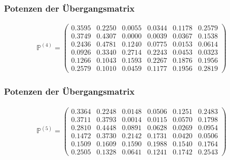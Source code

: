 \documentclass[compress]{beamer}
\begin{document}
	\begin{frame}
		\frametitle{Potenzen der Übergangsmatrix}
		\begin{center}
			\begin{align*}
				\mathbb{P} ^{(4)} =
				\begin{pmatrix} 
				  0.3595 &  0.2250 &  0.0055 &  0.0344 &  0.1178 &  0.2579\\
				  0.3749 &  0.4307 &  0.0000 &  0.0039 &  0.0367 &  0.1538\\
				  0.2436 &  0.4781 &  0.1240 &  0.0775 &  0.0153 &  0.0614\\
				  0.0926 &  0.3340 &  0.2714 &  0.2243 &  0.0453 &  0.0323\\
				  0.1266 &  0.1043 &  0.1593 &  0.2267 &  0.1876 &  0.1956\\
				  0.2579 &  0.1010 &  0.0459 &  0.1177 &  0.1956 &  0.2819
				\end{pmatrix} 
			\end{align*}
		\end{center}
	\end{frame}


	\begin{frame}
		\frametitle{Potenzen der Übergangsmatrix}
		\begin{center}
			\begin{align*}
				\mathbb{P} ^{(5)} =
				\begin{pmatrix} 
				  0.3364 &  0.2248 &  0.0148 &  0.0506 &  0.1251 &  0.2483\\
				  0.3711 &  0.3793 &  0.0014 &  0.0115 &  0.0570 &  0.1798\\
				  0.2810 &  0.4448 &  0.0891 &  0.0628 &  0.0269 &  0.0954\\
				  0.1472 &  0.3730 &  0.2142 &  0.1731 &  0.0420 &  0.0506\\
				  0.1509 &  0.1609 &  0.1590 &  0.1988 &  0.1540 &  0.1764\\
				  0.2505 &  0.1328 &  0.0641 &  0.1241 &  0.1742 &  0.2543
				\end{pmatrix} 
			\end{align*}
		\end{center}
	\end{frame}
\end{document}

